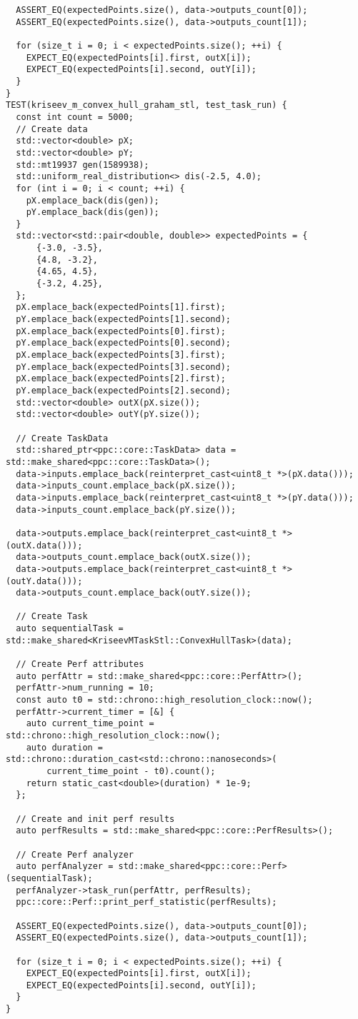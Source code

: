 \documentclass[a4paper]{article}
\begin{document}
\begin{lstlisting}
  ASSERT_EQ(expectedPoints.size(), data->outputs_count[0]);
  ASSERT_EQ(expectedPoints.size(), data->outputs_count[1]);

  for (size_t i = 0; i < expectedPoints.size(); ++i) {
    EXPECT_EQ(expectedPoints[i].first, outX[i]);
    EXPECT_EQ(expectedPoints[i].second, outY[i]);
  }
}
TEST(kriseev_m_convex_hull_graham_stl, test_task_run) {
  const int count = 5000;
  // Create data
  std::vector<double> pX;
  std::vector<double> pY;
  std::mt19937 gen(1589938);
  std::uniform_real_distribution<> dis(-2.5, 4.0);
  for (int i = 0; i < count; ++i) {
    pX.emplace_back(dis(gen));
    pY.emplace_back(dis(gen));
  }
  std::vector<std::pair<double, double>> expectedPoints = {
      {-3.0, -3.5},
      {4.8, -3.2},
      {4.65, 4.5},
      {-3.2, 4.25},
  };
  pX.emplace_back(expectedPoints[1].first);
  pY.emplace_back(expectedPoints[1].second);
  pX.emplace_back(expectedPoints[0].first);
  pY.emplace_back(expectedPoints[0].second);
  pX.emplace_back(expectedPoints[3].first);
  pY.emplace_back(expectedPoints[3].second);
  pX.emplace_back(expectedPoints[2].first);
  pY.emplace_back(expectedPoints[2].second);
  std::vector<double> outX(pX.size());
  std::vector<double> outY(pY.size());

  // Create TaskData
  std::shared_ptr<ppc::core::TaskData> data = std::make_shared<ppc::core::TaskData>();
  data->inputs.emplace_back(reinterpret_cast<uint8_t *>(pX.data()));
  data->inputs_count.emplace_back(pX.size());
  data->inputs.emplace_back(reinterpret_cast<uint8_t *>(pY.data()));
  data->inputs_count.emplace_back(pY.size());

  data->outputs.emplace_back(reinterpret_cast<uint8_t *>(outX.data()));
  data->outputs_count.emplace_back(outX.size());
  data->outputs.emplace_back(reinterpret_cast<uint8_t *>(outY.data()));
  data->outputs_count.emplace_back(outY.size());

  // Create Task
  auto sequentialTask = std::make_shared<KriseevMTaskStl::ConvexHullTask>(data);

  // Create Perf attributes
  auto perfAttr = std::make_shared<ppc::core::PerfAttr>();
  perfAttr->num_running = 10;
  const auto t0 = std::chrono::high_resolution_clock::now();
  perfAttr->current_timer = [&] {
    auto current_time_point = std::chrono::high_resolution_clock::now();
    auto duration = std::chrono::duration_cast<std::chrono::nanoseconds>(
        current_time_point - t0).count();
    return static_cast<double>(duration) * 1e-9;
  };

  // Create and init perf results
  auto perfResults = std::make_shared<ppc::core::PerfResults>();

  // Create Perf analyzer
  auto perfAnalyzer = std::make_shared<ppc::core::Perf>(sequentialTask);
  perfAnalyzer->task_run(perfAttr, perfResults);
  ppc::core::Perf::print_perf_statistic(perfResults);

  ASSERT_EQ(expectedPoints.size(), data->outputs_count[0]);
  ASSERT_EQ(expectedPoints.size(), data->outputs_count[1]);

  for (size_t i = 0; i < expectedPoints.size(); ++i) {
    EXPECT_EQ(expectedPoints[i].first, outX[i]);
    EXPECT_EQ(expectedPoints[i].second, outY[i]);
  }
}

\end{lstlisting}
\end{document}
